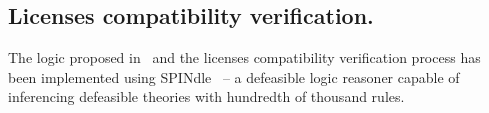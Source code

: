 \begin{figure}[ht!b]
\end{figure}

\subsection{Licenses compatibility verification.}
The logic proposed in~\cite{DBLP:conf/semweb/GovernatoriRVG13}
and the licenses compatibility verification process has been implemented using SPINdle~\cite{spindle}
-- a defeasible logic reasoner capable of inferencing defeasible theories with hundredth of thousand rules.

